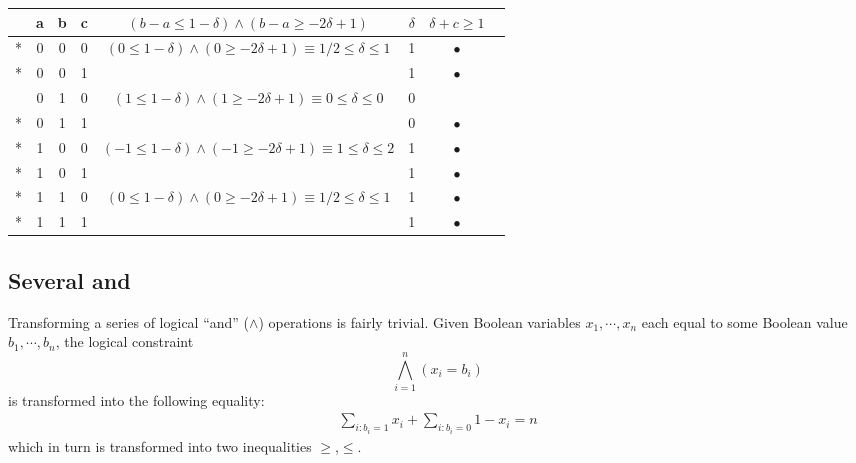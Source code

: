 \begin{table}[H]
\centering
	\begin{tabular}{cccccccc}
	  & a & b & c & $(b - a \le 1 - \delta) \wedge (b - a \ge -2\delta + 1)$                     & $\delta$ & $\delta + c \ge 1$ \\
	\midrule
	* & 0 & 0 & 0 & $(0 \le 1 - \delta) \wedge (0 \ge -2\delta + 1) \equiv 1/2 \le \delta \le 1$ &        1 & $\bullet$ \\
	* & 0 & 0 & 1 &                                                                              &        1 & $\bullet$ \\
	  & 0 & 1 & 0 & $(1 \le 1 - \delta) \wedge (1 \ge -2\delta + 1) \equiv   0 \le \delta \le 0$ &        0 &           \\
	* & 0 & 1 & 1 &                                                                              &        0 & $\bullet$ \\
	* & 1 & 0 & 0 & $(-1 \le 1 - \delta) \wedge (-1 \ge -2\delta + 1) \equiv 1 \le \delta \le 2$ &        1 & $\bullet$ \\
	* & 1 & 0 & 1 &                                                                              &        1 & $\bullet$ \\
	* & 1 & 1 & 0 & $(0 \le 1 - \delta) \wedge (0 \ge -2\delta + 1) \equiv 1/2 \le \delta \le 1$ &        1 & $\bullet$ \\
	* & 1 & 1 & 1 &                                                                              &        1 & $\bullet$ \\
	\end{tabular}
\label{table:B:3-linear-expressions}
\end{table}

\subsection{Several and}
\label{sec:examples-logical-constraints:several-ands}

Transforming a series of logical ``and'' ($\wedge$) operations is fairly trivial.
Given Boolean variables $x_1,\cdots,x_n$ each equal to some Boolean value $b_1,\cdots,b_n$,
the logical constraint
\begin{equation}
\label{eq:B:several-ands}
\bigwedge_{i=1}^{n} (x_i = b_i)
\end{equation}
is transformed into the following equality:
\begin{eqnarray}
\label{eq:B:several-ands:linear}
\sum_{i : b_i=1} x_i + \sum_{i : b_i=0} 1 - x_i = n
\end{eqnarray}
which in turn is transformed into two inequalities $\ge$,$\le$.

